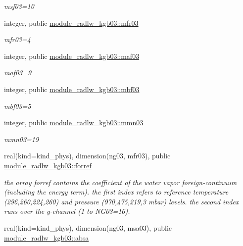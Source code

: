 \begin{DoxyCompactItemize}
\begin{DoxyCompactList}\small\item\em msf03=10 \end{DoxyCompactList}\item 
integer, public \hyperlink{group__module__radlw__kgbnn_ga4ea1e58a39585adc087718b92a16b529}{module\+\_\+radlw\+\_\+kgb03\+::mfr03}
\begin{DoxyCompactList}\small\item\em mfr03=4 \end{DoxyCompactList}\item 
integer, public \hyperlink{group__module__radlw__kgbnn_ga90d1081db011f0682cb4a83c40c5bb23}{module\+\_\+radlw\+\_\+kgb03\+::maf03}
\begin{DoxyCompactList}\small\item\em maf03=9 \end{DoxyCompactList}\item 
integer, public \hyperlink{group__module__radlw__kgbnn_ga655fff8711d78d62ae9d4fa27d02621a}{module\+\_\+radlw\+\_\+kgb03\+::mbf03}
\begin{DoxyCompactList}\small\item\em mbf03=5 \end{DoxyCompactList}\item 
integer, public \hyperlink{group__module__radlw__kgbnn_gab4e84b10460930267256c0e5a1fe7a55}{module\+\_\+radlw\+\_\+kgb03\+::mmn03}
\begin{DoxyCompactList}\small\item\em mmn03=19 \end{DoxyCompactList}\item 
real(kind=kind\+\_\+phys), dimension(ng03, mfr03), public \hyperlink{group__module__radlw__kgbnn_gafcc55fa81ba6369b56d29db2342c2e6a}{module\+\_\+radlw\+\_\+kgb03\+::forref}
\begin{DoxyCompactList}\small\item\em the array forref contains the coefficient of the water vapor foreign-\/continuum (including the energy term). the first index refers to reference temperature (296,260,224,260) and pressure (970,475,219,3 mbar) levels. the second index runs over the g-\/channel (1 to N\+G03=16). \end{DoxyCompactList}\item 
real(kind=kind\+\_\+phys), dimension(ng03, msa03), public \hyperlink{group__module__radlw__kgbnn_gac65fd4afedbd4bfa2c87c5e4f060a1d4}{module\+\_\+radlw\+\_\+kgb03\+::absa}

\end{DoxyCompactItemize}
